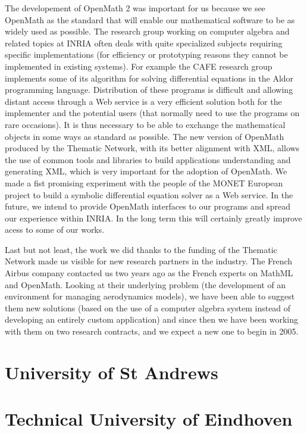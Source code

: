 The developement of OpenMath 2 was important for us because we see
OpenMath as the standard that will enable our mathematical software to
be as widely used as possible.  The research group working on computer
algebra and related topics at INRIA often deals with quite specialized
subjects requiring specific implementations (for efficiency or
prototyping reasons they cannot be implemented in existing systems). For
example the CAFE research group implements some of its algorithm for
solving differential equations in the Aldor programming language.
Distribution of these programs is difficult and allowing distant access
through a Web service is a very efficient solution both for the
implementer and the potential users (that normally need to use the
programs on rare occasions). It is thus necessary to be able to exchange
the mathematical objects in some ways as standard as possible. The new
version of OpenMath produced by the Thematic Network, with its better
alignment with XML, allows the use of common tools and libraries to build
applications understanding and generating XML, which is very important
for the adoption of OpenMath. We made a fist promising experiment with
the people of the MONET European project to build a symbolic
differential equation solver as a Web service.  In the future, we intend
to provide OpenMath interfaces to our programs and spread our experience
within INRIA. In the long term this will certainly greatly improve acess
to some of our works.
                                                                                
Last but not least, the work we did thanks to the funding of the
Thematic Network made us visible for new research partners in the
industry. The French Airbus company contacted us two years ago as the
French experts on MathML and OpenMath. Looking at their underlying
problem (the development of an environment for managing aerodynamics
models), we have been able to suggest them new solutions (based on the
use of a computer algebra system instead of developing an entirely
custom application) and since then we have been working with them on two
research contracts, and we expect a new one to begin in 2005.


\section{University of St Andrews}
  
\section{Technical University of Eindhoven}

